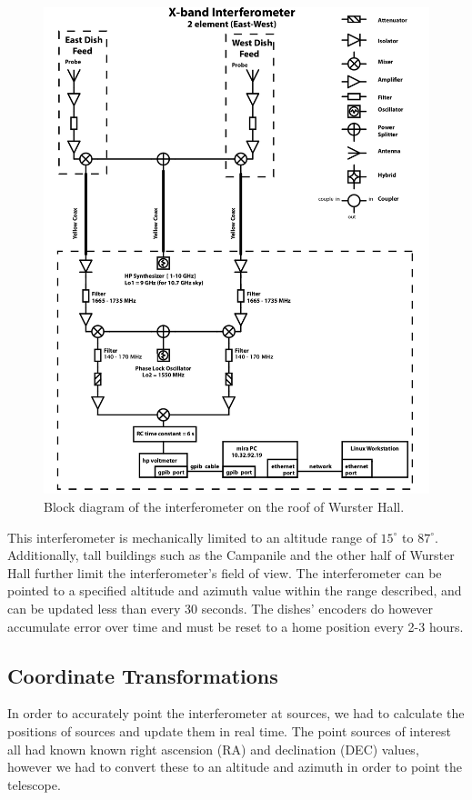 \documentclass{article}
\begin{document}
    \begin{figure}[h!]
    \centering
    \includegraphics[scale=0.3]{img/signal_path.png}
    \caption{Block diagram of the interferometer on the roof of Wurster Hall.}
    \label{fig:signal_path}
    \end{figure}

  This interferometer is mechanically limited to an altitude range of
  $15^{\circ}$ to $87^{\circ}$. Additionally, tall buildings such as the
  Campanile and the other half of Wurster Hall further limit the
  interferometer's field of view. The interferometer can be pointed to a
  specified altitude and azimuth value within the range described, and can be
  updated less than every 30 seconds. The dishes' encoders do however
  accumulate error over time and must be reset to a home position every 2-3
  hours.

  \subsection{Coordinate Transformations}
  In order to accurately point the interferometer at sources, we had to
  calculate the positions of sources and update them in real time. The point
  sources of interest all had known known right ascension (RA) and declination
  (DEC) values, however we had to convert these to an altitude and azimuth in
  order to point the telescope.
\end{document}
